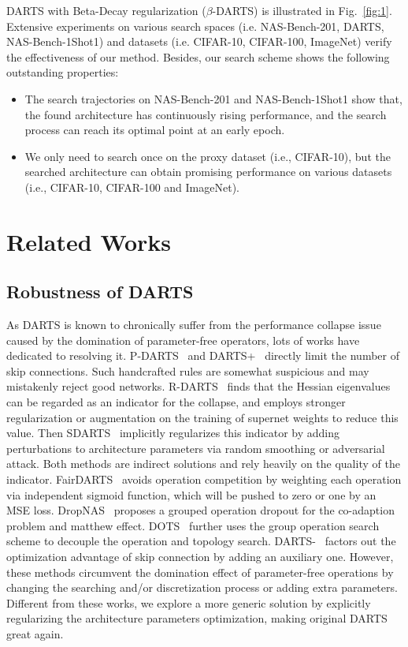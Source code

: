 \documentclass[10pt,twocolumn,letterpaper]{article}
\begin{document}
DARTS with Beta-Decay regularization ($\beta$-DARTS) is illustrated in Fig.~\ref{fig:1}. Extensive experiments on various search spaces (i.e. NAS-Bench-201, DARTS, NAS-Bench-1Shot1) and datasets (i.e. CIFAR-10, CIFAR-100, ImageNet) verify the effectiveness of our method. Besides, our search scheme shows the following outstanding properties:
 \begin{itemize}
\vspace{-8pt}
\item The search trajectories on NAS-Bench-201 and NAS-Bench-1Shot1 show that, the found architecture has continuously rising performance, and the search process can reach its optimal point at an early epoch.
\vspace{-8pt}
\item We only need to search once on the proxy dataset (i.e., CIFAR-10), but the searched architecture can obtain promising performance on various datasets (i.e., CIFAR-10, CIFAR-100 and ImageNet).
\end{itemize}

\section{Related Works} \label{sec:related work}
\subsection{Robustness of DARTS}
As DARTS is known to chronically suffer from the performance collapse issue caused by the domination of parameter-free operators, lots of works have dedicated to resolving it. P-DARTS~\cite{pdarts} and DARTS+~\cite{darts+} directly limit the number of skip connections. Such handcrafted rules are somewhat suspicious and may mistakenly reject good networks. R-DARTS~\cite{rdarts} finds that the Hessian eigenvalues can be regarded as an indicator for the collapse, and employs stronger regularization or augmentation on the training of supernet weights to reduce this value. Then SDARTS~\cite{sdarts} implicitly regularizes this indicator by adding perturbations to architecture parameters via random smoothing or adversarial attack. Both methods are indirect solutions and rely heavily on the quality of the indicator. FairDARTS~\cite{fairdarts} avoids operation competition by weighting each operation via independent sigmoid function, which will be pushed to zero or one by an MSE loss. DropNAS~\cite{dropnas} proposes a grouped operation dropout for the co-adaption problem and matthew effect. DOTS~\cite{dots} further uses the group operation search scheme to decouple the operation and topology search. DARTS-~\cite{darts-} factors out the optimization advantage of skip connection by adding an auxiliary one. However, these methods circumvent the domination effect of parameter-free operations by changing the searching and/or discretization process or adding extra parameters. Different from these works, we explore a more generic solution by explicitly regularizing the architecture parameters optimization, making original DARTS great again.
\end{document}
